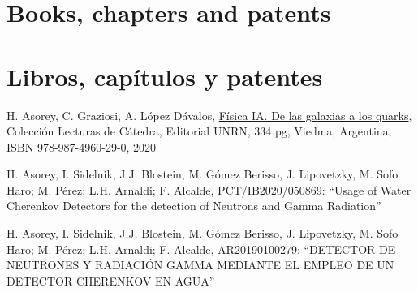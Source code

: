 \ifeng
\section*{Books, chapters and patents}
\else
\section*{Libros, capítulos y patentes}
\fi
\noindent
\begin{etaremune}
\item {} H. Asorey, C. Graziosi, A. López Dávalos, \href{https://editorial.unrn.edu.ar/index.php/catalogo/346/view_bl/62/lecturas-de-catedra/92/fisica-ia-de-las-galaxias-a-los-quarks}{Física IA. De las galaxias a los quarks}, Colección Lecturas de Cátedra, Editorial UNRN, 334 pg, Viedma, Argentina, ISBN 978-987-4960-29-0, 2020 
% 
\item {} H. Asorey, I. Sidelnik, J.J. Blostein, M. Gómez Berisso, J. Lipovetzky, M. Sofo Haro; M. Pérez; L.H. Arnaldi; F. Alcalde, PCT/IB2020/050869: ``Usage of Water Cherenkov Detectors for the detection of Neutrons and Gamma Radiation''
\item {} H. Asorey, I. Sidelnik, J.J. Blostein, M. Gómez Berisso, J. Lipovetzky, M. Sofo Haro; M. Pérez; L.H. Arnaldi; F. Alcalde, AR20190100279: ``DETECTOR DE NEUTRONES Y RADIACIÓN GAMMA MEDIANTE EL EMPLEO DE UN DETECTOR  CHERENKOV EN AGUA''
\end{etaremune}
